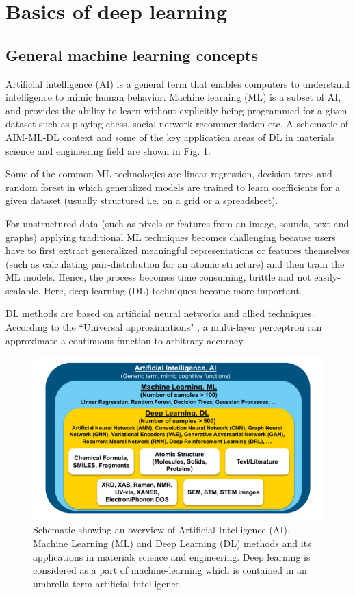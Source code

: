 \documentclass[pdflatex,sn-mathphys]{sn-jnl}%
\theoremstyle{thmstyleone}%
\theoremstyle{thmstyletwo}%
\theoremstyle{thmstylethree}%
\begin{document}
\section{Basics of deep learning}\label{sec:basics}

\subsection{General machine learning concepts}\label{sec:general-concepts}

Artificial intelligence (AI) \cite{friedman2001elements} is a general term that enables computers to understand intelligence to mimic human behavior. Machine learning (ML) is a subset of AI, and provides the ability to learn without explicitly being programmed for a given dataset such as playing chess, social network recommendation etc. A schematic of AIM-ML-DL context and some of the key application areas of DL in materials science and engineering field are shown in Fig. 1.

Some of the common ML technologies are linear regression, decision trees and random forest in which generalized models are trained to learn coefficients for a given dataset (usually structured i.e. on a grid or a spreadsheet). 

 For unstructured data  (such as pixels or features from an image, sounds, text and graphs) applying traditional ML techniques becomes challenging because users have to first extract generalized meaningful representations or features themselves (such as calculating pair-distribution for an atomic structure) and then train the ML models. Hence, the process becomes time consuming, brittle and not easily-scalable. Here, deep learning (DL) techniques become more important. 
 
 DL methods are based on artificial neural networks and allied techniques. According to the ``Universal approximations" \cite{kidger2020universal}, a multi-layer perceptron can approximate a continuous function to arbitrary accuracy.

\begin{figure}
    \centering
    \includegraphics[trim={0 0cm 0 0cm},clip,width=1.0\textwidth]{Figures/Fig1.pdf}
    \caption{Schematic showing an overview of Artificial Intelligence (AI), Machine Learning (ML) and Deep Learning (DL) methods and its applications in materials science and engineering. Deep learning is considered as a part of machine-learning which is contained in an umbrella term artificial intelligence.}
\end{figure}
\end{document}
